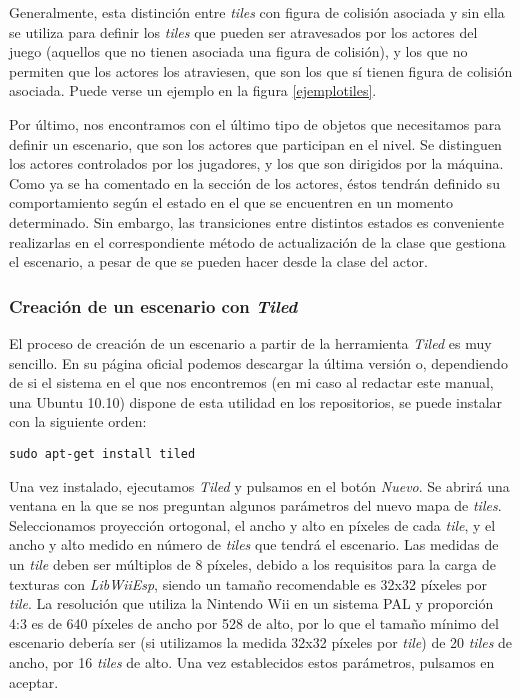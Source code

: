 Generalmente, esta distinción entre \emph{tiles} con figura de colisión asociada y sin ella se utiliza para definir los \emph{tiles} que pueden ser atravesados por los actores del juego (aquellos que no tienen asociada una figura de colisión), y los que no permiten que los actores los atraviesen, que son los que sí tienen figura de colisión asociada. Puede verse un ejemplo en la figura \ref{ejemplotiles}.\\


Por último, nos encontramos con el último tipo de objetos que necesitamos para definir un escenario, que son los actores que participan en el nivel. Se distinguen los actores controlados por los jugadores, y los que son dirigidos por la máquina.\\

Como ya se ha comentado en la sección de los actores, éstos tendrán definido su comportamiento según el estado en el que se encuentren en un momento determinado. Sin embargo, las transiciones entre distintos estados es conveniente realizarlas en el correspondiente método de actualización de la clase que gestiona el escenario, a pesar de que se pueden hacer desde la clase del actor.

\subsubsection{Creación de un escenario con \emph{Tiled}}

El proceso de creación de un escenario a partir de la herramienta \emph{Tiled} \cite{website:tiled} es muy sencillo. En su página oficial podemos descargar la última versión o, dependiendo de si el sistema en el que nos encontremos (en mi caso al redactar este manual, una Ubuntu 10.10) dispone de esta utilidad en los repositorios, se puede instalar con la siguiente orden:

\begin{lstlisting}[style=consola]
sudo apt-get install tiled
\end{lstlisting}

Una vez instalado, ejecutamos \emph{Tiled} y pulsamos en el botón \emph{Nuevo}. Se abrirá una ventana en la que se nos preguntan algunos parámetros del nuevo mapa de \emph{tiles}. Seleccionamos proyección ortogonal, el ancho y alto en píxeles de cada \emph{tile}, y el ancho y alto medido en número de \emph{tiles} que tendrá el escenario. Las medidas de un \emph{tile} deben ser múltiplos de 8 píxeles, debido a los requisitos para la carga de texturas con \emph{LibWiiEsp}, siendo un tamaño recomendable es 32x32 píxeles por \emph{tile}. La resolución que utiliza la Nintendo Wii en un sistema PAL y proporción 4:3 es de 640 píxeles de ancho por 528 de alto, por lo que el tamaño mínimo del escenario debería ser (si utilizamos la medida 32x32 píxeles por \emph{tile}) de 20 \emph{tiles} de ancho, por 16 \emph{tiles} de alto. Una vez establecidos estos parámetros, pulsamos en aceptar.\\

